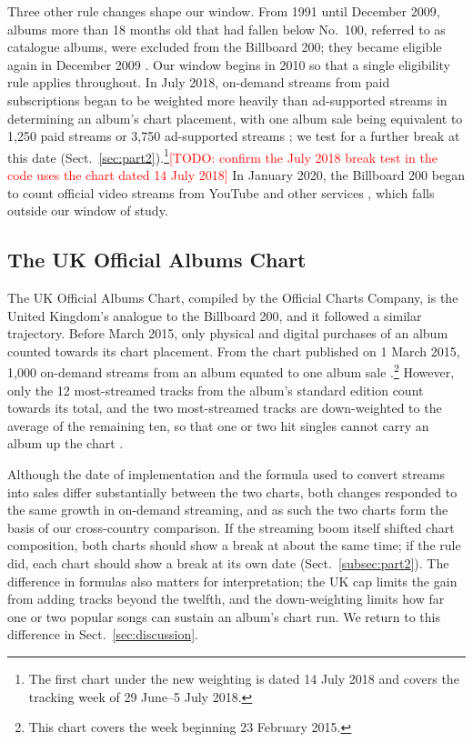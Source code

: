 \documentclass[pdflatex,sn-apa]{sn-jnl}
\newcommand{\todo}[1]{\textcolor{red}{[TODO: #1]}}
\begin{document}
Three other rule changes shape our window. From 1991 until December 2009, albums more than 18 months old that had fallen below No.~100, referred to as catalogue albums, were excluded from the Billboard 200; they became eligible again in December 2009 \citep{billboard2009makeover}. Our window begins in 2010 so that a single eligibility rule applies throughout. In July 2018, on-demand streams from paid subscriptions began to be weighted
more heavily than ad-supported streams in determining an album's chart placement, with one album sale being equivalent to 1,250 paid streams or 3,750 ad-supported streams \citep{billboard2018weighting}; we test for a further break at this date (Sect.~\ref{sec:part2}).\footnote{The first chart under the new weighting is dated 14 July 2018 and covers the tracking week of 29 June--5 July 2018.}\todo{confirm the July 2018 break test in the code uses the chart dated 14 July 2018} In January 2020, the Billboard 200 began to count official video streams from YouTube and other services \citep{billboard2019video}, which falls outside our
window of study.


\subsection{The UK Official Albums Chart}\label{subsec:uk}
The UK Official Albums Chart, compiled by the Official Charts Company, is the United Kingdom's analogue to the Billboard 200, and it followed a similar trajectory. Before March 2015, only physical and digital purchases of an album counted towards its chart placement. From the chart published on 1 March 2015, 1,000 on-demand streams from an album equated to one album sale \citep{occ2015streams}.\footnote{This chart covers the week beginning 23 February 2015.} However, only the 12 most-streamed tracks from the album's standard edition count towards its total, and the two most-streamed tracks are down-weighted to the average of the remaining ten, so that one or two hit singles cannot carry an album up the chart \citep{occ2015streams}.

Although the date of implementation and the formula used to convert streams into sales differ substantially between the two charts, both changes responded to the same growth in on-demand streaming, and as such the two charts form the basis of our cross-country comparison. If the streaming boom itself shifted chart composition, both charts should show a break at about the same time; if the rule did, each chart should show a break at its own date (Sect.~\ref{subsec:part2}). The difference in formulas also matters for interpretation; the UK cap limits the gain from adding tracks beyond the twelfth, and the down-weighting limits how far one or two popular songs can sustain an album's chart run. We return to this difference in Sect.~\ref{sec:discussion}.
\end{document}
